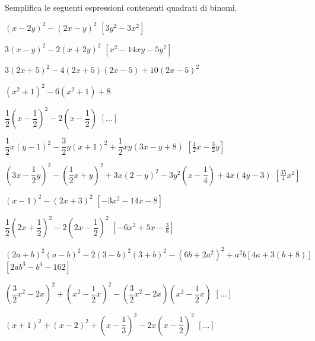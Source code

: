\begin{esercizio}[\Ast]
 \label{ese:11.8}
Semplifica le seguenti espressioni contenenti quadrati di binomi.

\begin{enumeratea}
 \item \(\left(x-2y\right)^{2}-\left(2x-y\right)^{2}\) 
  \hfill \(\left[3y^{2}-3x^{2}\right]\)
 \item \(3(x-y)^{2}-2(x+2y)^{2}\)
  \hfill \(\left[x^{2}-14xy-5y^{2}\right]\)
 \item \(3(2x+5)^{2}-4(2x+5)(2x-5)+10(2x-5)^{2}\)
 \item \(\left(x^{2}+1\right)^{2}-6\left(x^{2}+1\right)+8\)
 \item \(\dfrac{1}{2}\left(x-\dfrac{1}{2}\right)^{2}-
         2\left(x-\dfrac{1}{2}\right)\)
  \hfill \(\left[ \dots \right]\)
 \item \(\dfrac{1}{2}x(y-1)^{2}-\dfrac{3}{2}y(x+1)^{2}+\dfrac{1}{2}{xy}(3x-y+8)\)
  \hfill \(\left[\frac{1}{2}x-\frac{3}{2}y\right]\)
 \item \(\left(3x-\dfrac{1}{2}y\right)^{2}-
        \left(\dfrac{1}{2}x+y\right)^{2}+3x(2-y)^{2}
        -3y^{2}\left(x-\dfrac{1}{4}\right)+4x(4y-3)\)
  \hfill \(\left[\frac{35}{4}x^{2}\right]\)
 \item \(\left(x-1\right)^{2}-\left(2x+3\right)^{2}\)
  \hfill \(\left[-3x^{2}-14x-8\right]\)
 \item \(\dfrac{1}{2}\left(2x+\dfrac{1}{2}\right)^{2}-2\left(2x-
        \dfrac{1}{2}\right)^{2}\)
  \hfill \(\left[-6x^{2}+5x-\frac{3}{8}\right]\)
 \item \((2a+b)^{2}(a-b)^{2}-2(3-b)^{2}(3+b)^{2}-
        (6b+2a^{2})^{2}+a^{2}b[4a+3(b+8)]\)
  \hfill \(\left[2{ab}^{3}-b^{4}-162\right]\)
 \item \(\left(\dfrac{3}{2}x^{2}-2x\right)^{2}+\left(x^{2}-
        \dfrac{1}{2}x\right)^{2}-\left(\dfrac{3}{2}x^{2}-2x\right)
        \left(x^{2}-\dfrac{1}{2}x\right)\)
  \hfill \(\left[ \dots \right]\)
 \item \((x+1)^{2}+(x-2)^{2}+\left(x-\dfrac{1}{3}\right)^{2}-
        2x\left(x-\dfrac{1}{2}\right)^{2}\)
  \hfill \(\left[ \dots \right]\)
\end{enumeratea}
\end{esercizio}

\subsubsection*{}

